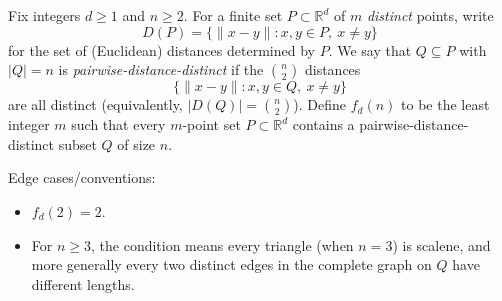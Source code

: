 Fix integers $d\ge 1$ and $n\ge 2$. For a finite set $P\subset \mathbb{R}^d$ of $m$ \emph{distinct} points, write
\[D(P)=\{\|x-y\| : x,y\in P,\ x\neq y\}\]
for the set of (Euclidean) distances determined by $P$.
We say that $Q\subseteq P$ with $|Q|=n$ is \emph{pairwise-distance-distinct} if the $\binom{n}{2}$ distances
\[\{\|x-y\|: x,y\in Q,\ x\neq y\}
\]
are all distinct (equivalently, $|D(Q)|=\binom{n}{2}$).
Define $f_d(n)$ to be the least integer $m$ such that every $m$-point set $P\subset \mathbb{R}^d$ contains a pairwise-distance-distinct subset $Q$ of size $n$.

Edge cases/conventions:
\begin{itemize}
\item $f_d(2)=2$.
\item For $n\ge 3$, the condition means every triangle (when $n=3$) is scalene, and more generally every two distinct edges in the complete graph on $Q$ have different lengths.
\end{itemize}
